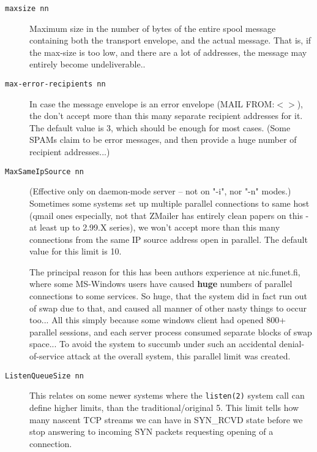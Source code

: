 \begin{description}
\item[{\tt maxsize nn}] \mbox{}

Maximum size in the number of bytes of the entire spool message
containing both the transport envelope, and the actual message.
That is, if the max-size is too low, and there are a lot of
addresses, the message may entirely become undeliverable..



\item[{\tt max-error-recipients nn}] \mbox{}

In case the message envelope is an error envelope (MAIL FROM:{\(<\)}{\(>\)}),
the don't accept more than this many separate recipient addresses
for it. The default value is 3, which should be enough for most cases.
(Some SPAMs claim to be error messages, and then provide a huge
number of recipient addresses...)



\item[{\tt MaxSameIpSource nn}] \mbox{}

(Effective only on daemon-mode server -- not on "-i", nor "-n" modes.)
Sometimes some systems set up multiple parallel connections to same
host  (qmail ones especially, not that ZMailer has entirely clean
papers on this - at least up to 2.99.X series), we won't accept
more than this many connections from the same IP source address
open in parallel.  The default value for this limit is 10.

The principal reason for this has been authors experience at nic.funet.fi,
where some MS-Windows users have caused {\bf huge} numbers
of parallel connections to some services.  So huge, that the system
did in fact run out of swap due to that, and caused all manner of
other nasty things to occur too...  All this simply because some
windows client had opened 800+ parallel sessions, and each server
process consumed separate blocks of swap space...  To avoid the
system to succumb under such an accidental denial-of-service attack
at the overall system, this parallel limit was created.



\item[{\tt ListenQueueSize nn}] \mbox{}

This relates on some newer systems where the {\tt listen(2)} system call
can define higher limits, than the traditional/original 5.  This
limit tells how many nascent TCP streams we can have in SYN\_RCVD
state before we stop answering to incoming SYN packets requesting
opening of a connection.


\end{description}
